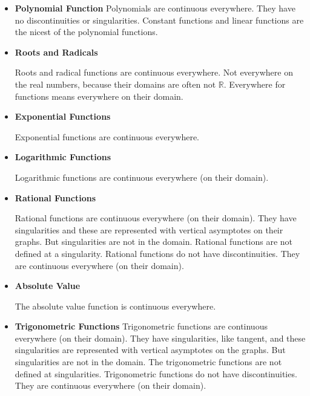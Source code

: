 \documentclass{ximera}
\begin{document}
\begin{itemize} 

\item \textbf{Polynomial Function}  Polynomials are continuous everywhere. They have no discontinuities or singularities. Constant functions and linear functions are the nicest of the polynomial functions.





\item \textbf{Roots and Radicals}

Roots and radical functions are continuous everywhere.  Not everywhere on the real numbers, because their domains are often not $\mathbb{R}$. Everywhere for functions means everywhere on their domain.






\item \textbf{Exponential Functions}

Exponential functions are continuous everywhere.





\item \textbf{Logarithmic Functions}

Logarithmic functions are continuous everywhere (on their domain).






\item \textbf{Rational Functions}

Rational functions are continuous everywhere (on their domain).  They have singularities and these are represented with vertical asymptotes on their graphs.  But singularities are not in the domain.  Rational functions are not defined at a singularity. Rational functions do not have discontinuities.  They are continuous everywhere (on their domain). 





\item \textbf{Absolute Value}

The absolute value function is continuous everywhere.







\item \textbf{Trigonometric Functions}
Trigonometric functions are continuous everywhere (on their domain).  They have singularities, like tangent, and these singularities are represented with vertical asymptotes on the graphs.  But singularities are not in the domain.  The trigonometric functions are not defined at singularities. Trigonometric functions do not have discontinuities.  They are continuous everywhere (on their domain). 








\end{itemize}
\end{document}
